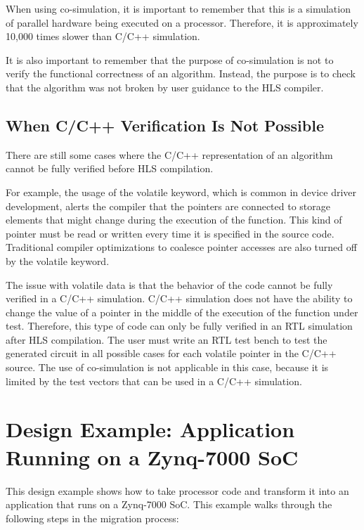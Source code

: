 \par When using co-simulation, it is important to remember that this is a simulation of parallel
hardware being executed on a processor. Therefore, it is approximately 10,000 times slower
than C/C++ simulation. 

\begin{highlight}
  It is also important to remember that the purpose of co-simulation is not to verify the functional correctness of an algorithm. Instead, the purpose is to check that the algorithm was not broken by user guidance to the HLS compiler.
\end{highlight}


\subsection{When C/C++ Verification Is Not Possible}
There are still some cases where the C/C++ representation of an algorithm cannot be fully verified before HLS compilation. 

\par For example, the usage of the
volatile keyword, which is common in device driver development, alerts the compiler
that the pointers are connected to storage elements that might change during the
execution of the function. This kind of pointer must be read or written every time it is
specified in the source code. Traditional compiler optimizations to coalesce pointer
accesses are also turned off by the volatile keyword.

\par The issue with volatile data is that the behavior of the code cannot be fully verified in a
C/C++ simulation. C/C++ simulation does not have the ability to change the value of a
pointer in the middle of the execution of the function under test. Therefore, this type of
code can only be fully verified in an RTL simulation after HLS compilation. The user must
write an RTL test bench to test the generated circuit in all possible cases for each volatile
pointer in the C/C++ source. The use of co-simulation is not applicable in this case, because
it is limited by the test vectors that can be used in a C/C++ simulation.

\clearpage

\section{Design Example: Application Running on a Zynq-7000 SoC}
This design example shows how to take processor code and transform it into an application
that runs on a Zynq-7000 SoC. This example walks through the following steps in the
migration process:


